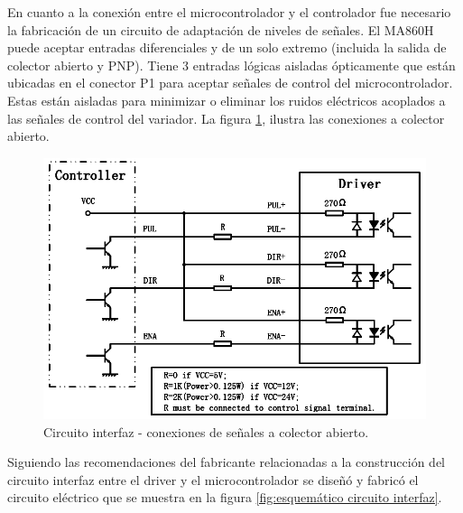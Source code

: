 En cuanto a la conexión entre el microcontrolador y el controlador fue necesario la fabricación de un circuito de adaptación de niveles de señales. El MA860H puede aceptar entradas diferenciales y de un solo extremo (incluida la salida de colector abierto y PNP). Tiene 3 entradas lógicas aisladas ópticamente que están ubicadas en el conector P1 para aceptar señales de control del microcontrolador. Estas están aisladas para minimizar o eliminar los ruidos eléctricos acoplados a las señales de control del variador. La figura \ref{fig:circuito interfaz}, ilustra las conexiones a colector abierto.

\begin{figure}[htpb]
\centering
\includegraphics[scale=.55]{./Figures/circuitointerfaz-driver.png}
\caption{Circuito interfaz - conexiones de señales a colector abierto.}
\label{fig:circuito interfaz}
\end{figure}

Siguiendo las recomendaciones del fabricante relacionadas a la construcción del circuito interfaz entre el driver y el microcontrolador se diseñó y fabricó el circuito eléctrico que se muestra en la figura \ref{fig:esquemático circuito interfaz}.

